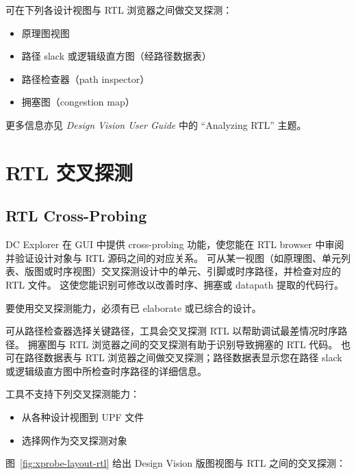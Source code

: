 
可在下列各设计视图与 RTL 浏览器之间做交叉探测：
\begin{itemize}
  \item 原理图视图
  \item 路径 slack 或逻辑级直方图（经路径数据表）
  \item 路径检查器（path inspector）
  \item 拥塞图（congestion map）
\end{itemize}

更多信息亦见 \textit{Design Vision User Guide} 中的 ``Analyzing RTL'' 主题。

\section{RTL 交叉探测}
\subsection*{RTL Cross-Probing}

DC Explorer 在 GUI 中提供 cross-probing 功能，使您能在 RTL browser 中审阅并验证设计对象与 RTL 源码之间的对应关系。
可从某一视图（如原理图、单元列表、版图或时序视图）交叉探测设计中的单元、引脚或时序路径，并检查对应的 RTL 文件。
这使您能识别可修改以改善时序、拥塞或 datapath 提取的代码行。

\begin{noteBox}
要使用交叉探测能力，必须有已 elaborate 或已综合的设计。
\end{noteBox}

可从路径检查器选择关键路径，工具会交叉探测 RTL 以帮助调试最差情况时序路径。
拥塞图与 RTL 浏览器之间的交叉探测有助于识别导致拥塞的 RTL 代码。
也可在路径数据表与 RTL 浏览器之间做交叉探测；路径数据表显示您在路径 slack 或逻辑级直方图中所检查时序路径的详细信息。

工具不支持下列交叉探测能力：
\begin{itemize}
  \item 从各种设计视图到 UPF 文件
  \item 选择网作为交叉探测对象
\end{itemize}

图~\ref{fig:xprobe-layout-rtl} 给出 Design Vision 版图视图与 RTL 之间的交叉探测：


